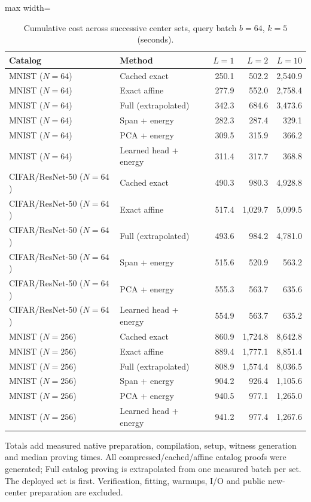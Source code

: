 \documentclass[5p,times,twocolumn]{elsarticle}
\theoremstyle{plain}
\theoremstyle{definition}
\theoremstyle{remark}
\begin{document}
\par\endgroup
\begingroup\color{RevisionGreen}
\begin{table}[tp]\color{RevisionGreen}
\caption{Cumulative cost across successive center sets, query batch $b=64$, $k=5$ (seconds).}\label{tab:reuse-cost}
\centering\small
\begin{adjustbox}{max width=\textwidth}
\begin{tabular}{@{}llrrr@{}}
\toprule
Catalog & Method & $L=1$ & $L=2$ & $L=10$ \\
\midrule
MNIST ($N=64$) & Cached exact & 250.1 & 502.2 & 2,540.9 \\
MNIST ($N=64$) & Exact affine & 277.9 & 552.0 & 2,758.4 \\
MNIST ($N=64$) & Full (extrapolated) & 342.3 & 684.6 & 3,473.6 \\
MNIST ($N=64$) & Span + energy & 282.3 & 287.4 & 329.1 \\
MNIST ($N=64$) & PCA + energy & 309.5 & 315.9 & 366.2 \\
MNIST ($N=64$) & Learned head + energy & 311.4 & 317.7 & 368.8 \\
CIFAR/ResNet-50 ($N=64$) & Cached exact & 490.3 & 980.3 & 4,928.8 \\
CIFAR/ResNet-50 ($N=64$) & Exact affine & 517.4 & 1,029.7 & 5,099.5 \\
CIFAR/ResNet-50 ($N=64$) & Full (extrapolated) & 493.6 & 984.2 & 4,781.0 \\
CIFAR/ResNet-50 ($N=64$) & Span + energy & 515.6 & 520.9 & 563.2 \\
CIFAR/ResNet-50 ($N=64$) & PCA + energy & 555.3 & 563.7 & 635.6 \\
CIFAR/ResNet-50 ($N=64$) & Learned head + energy & 554.9 & 563.7 & 635.2 \\
MNIST ($N=256$) & Cached exact & 860.9 & 1,724.8 & 8,642.8 \\
MNIST ($N=256$) & Exact affine & 889.4 & 1,777.1 & 8,851.4 \\
MNIST ($N=256$) & Full (extrapolated) & 808.9 & 1,574.4 & 8,036.5 \\
MNIST ($N=256$) & Span + energy & 904.2 & 926.4 & 1,105.6 \\
MNIST ($N=256$) & PCA + energy & 940.5 & 977.1 & 1,265.0 \\
MNIST ($N=256$) & Learned head + energy & 941.2 & 977.4 & 1,267.6 \\
\bottomrule
\end{tabular}
\end{adjustbox}
\par\smallskip\begin{minipage}{0.98\textwidth}\footnotesize Totals add measured native preparation, compilation, setup, witness generation and median proving times. All compressed/cached/affine catalog proofs were generated; Full catalog proving is extrapolated from one measured batch per set. The deployed set is first. Verification, fitting, warmups, I/O and public new-center preparation are excluded.\end{minipage}
\end{table}
\end{document}
